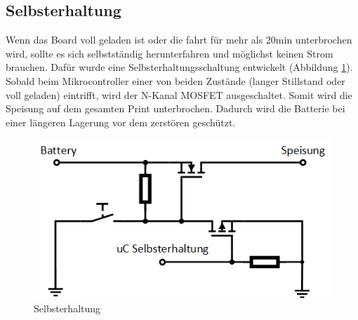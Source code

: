 \subsection*{Selbsterhaltung}
Wenn das Board voll geladen ist oder die fahrt für mehr als 20min unterbrochen wird, sollte es sich selbstständig herunterfahren und möglichst keinen Strom brauchen. Dafür wurde eine Selbsterhaltungsschaltung entwickelt (Abbildung \ref{fig:Selbsterhaltung}). Sobald beim Mikrocontroller einer von beiden Zustände (langer Stillstand oder voll geladen) eintrifft, wird der N-Kanal MOSFET ausgeschaltet. Somit wird die Speisung auf dem gesamten Print unterbrochen. Dadurch wird die Batterie bei einer längeren Lagerung vor dem zerstören geschützt.

\begin{figure} [H]
	\centering
	\includegraphics[width=0.6\linewidth]{images/Selbsterhaltung}
	\caption{Selbsterhaltung}
	\label{fig:Selbsterhaltung}
\end{figure}




